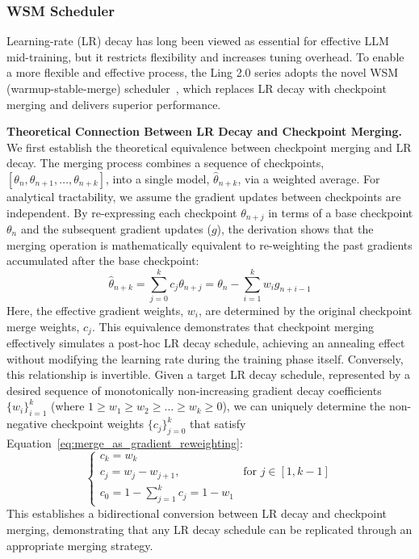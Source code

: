 \documentclass[table]{gtech}
\theoremstyle{definition}
\newcommand{\paratitle}[1]{\vspace{1.5ex}\noindent\textbf{#1}}
\begin{document}
\subsubsection{WSM Scheduler}
\label{sec:merging}
Learning-rate (LR) decay has long been viewed as essential for effective LLM mid-training, but it restricts flexibility and increases tuning overhead. To enable a more flexible and effective process, the Ling 2.0 series adopts the novel WSM (warmup-stable-merge) scheduler~\citep{tian2025wsmdecayfreelearningrate}, which replaces LR decay with checkpoint merging and delivers superior performance. 

\paratitle{Theoretical Connection Between LR Decay and Checkpoint Merging. } 
We first establish the theoretical equivalence between checkpoint merging and LR decay. The merging process combines a sequence of checkpoints, $[\theta_n, \theta_{n+1}, \dots, \theta_{n+k}]$, into a single model, $\hat{\theta}_{n+k}$, via a weighted average. For analytical tractability, we assume the gradient updates between checkpoints are independent. By re-expressing each checkpoint $\theta_{n+j}$ in terms of a base checkpoint $\theta_n$ and the subsequent gradient updates ($g$), the derivation shows that the merging operation is mathematically equivalent to re-weighting the past gradients accumulated after the base checkpoint:
\begin{equation}
\label{eq:merge_as_gradient_reweighting}
    \hat{\theta}_{n+k} = \sum_{j=0}^{k} c_j \theta_{n+j} = \theta_n - \sum_{i=1}^{k} w_i g_{n+i-1}
\end{equation}
Here, the effective gradient weights, $w_i$, are determined by the original checkpoint merge weights, $c_j$. This equivalence demonstrates that checkpoint merging effectively simulates a post-hoc LR decay schedule, achieving an annealing effect without modifying the learning rate during the training phase itself.
Conversely, this relationship is invertible. Given a target LR decay schedule, represented by a desired sequence of monotonically non-increasing gradient decay coefficients $\{w_i\}_{i=1}^k$ (where $1 \ge w_1 \ge w_2 \ge \dots \ge w_k \ge 0$), we can uniquely determine the non-negative checkpoint weights $\{c_j\}_{j=0}^k$ that satisfy Equation~\ref{eq:merge_as_gradient_reweighting}:
\begin{equation}
\begin{cases}
    c_k = w_k \\
    c_j = w_j - w_{j+1}, & \text{for } j \in [1, k-1] \\
    c_0 = 1 - \sum_{j=1}^{k} c_j = 1 - w_1
\end{cases}
\label{eq:inverse_formula}
\end{equation}
This establishes a bidirectional conversion between LR decay and checkpoint merging, demonstrating that any LR decay schedule can be replicated through an appropriate merging strategy. 
\end{document}
